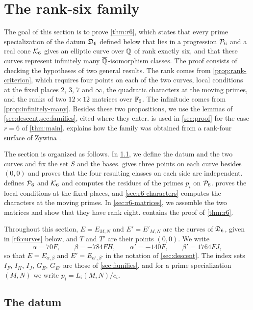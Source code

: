 \chapter{The rank-six family}\label{sec:rank6}

The goal of this section is to prove \cref{thm:r6}, which states that every prime specialization of the datum $\mathfrak D_6$ defined below that lies in a progression $\mathcal P_6$ and a real cone $\mathcal K_6$ gives an elliptic curve over $\mathbb Q$ of rank exactly six, and that these curves represent infinitely many $\overline{\mathbb Q}$-isomorphism classes. The proof consists of checking the hypotheses of two general results. The rank comes from \cref{prop:rank-criterion}, which requires four points on each of the two curves, local conditions at the fixed places $2$, $3$, $7$ and $\infty$, the quadratic characters at the moving primes, and the ranks of two $12\times12$ matrices over $\mathbb F_2$. The infinitude comes from \cref{prop:infinitely-many}. Besides these two propositions, we use the lemmas of \cref{sec:descent,sec:families}, cited where they enter.  is used in \cref{sec:proof} for the case $r=6$ of \cref{thm:main}.  explains how the family was obtained from a rank-four surface of Zywina \cite[\S6.5]{Zywina2026}.

The section is organized as follows. In \cref{sec:r6-datum}, we define the datum and the two curves and fix the set $S$ and the bases.  gives three points on each curve besides $(0,0)$ and proves that the four resulting classes on each side are independent.  defines $\mathcal P_6$ and $\mathcal K_6$ and computes the residues of the primes $p_i$ on $\mathcal P_6$.  proves the local conditions at the fixed places, and \cref{sec:r6-characters} computes the characters at the moving primes. In \cref{sec:r6-matrices}, we assemble the two matrices and show that they have rank eight.  contains the proof of \cref{thm:r6}.

Throughout this section, $E=E_{M,N}$ and $E'=E'_{M,N}$ are the curves of $\mathfrak D_6$, given in \eqref{r6:curves} below, and $T$ and $T'$ are their points $(0,0)$. We write
\[
\alpha=70F,\qquad \beta=-784FH,\qquad \alpha'=-140F,\qquad \beta'=1764FJ,
\]
so that $E=E_{\alpha,\beta}$ and $E'=E_{\alpha',\beta'}$ in the notation of \cref{sec:descent}. The index sets $I_F$, $I_H$, $I_J$, $G_E$, $G_{E'}$ are those of \cref{sec:families}, and for a prime specialization $(M,N)$ we write $p_i=L_i(M,N)/c_i$.

\section{The datum}\label{sec:r6-datum}

